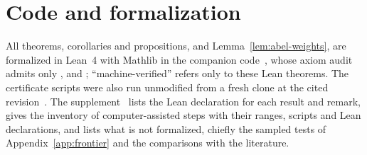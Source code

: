 \section*{Code and formalization}

All theorems, corollaries and propositions, and Lemma~\ref{lem:abel-weights}, are formalized in Lean~4 with Mathlib in the companion code~\cite{code}, whose axiom audit admits only ,  and ; ``machine-verified'' refers only to these Lean theorems. The certificate scripts were also run unmodified from a fresh clone at the cited revision~\cite{docs}. The supplement~\cite{supp} lists the Lean declaration for each result and remark, gives the inventory of computer-assisted steps with their ranges, scripts and Lean declarations, and lists what is not formalized, chiefly the sampled tests of Appendix~\ref{app:frontier} and the comparisons with the literature.

